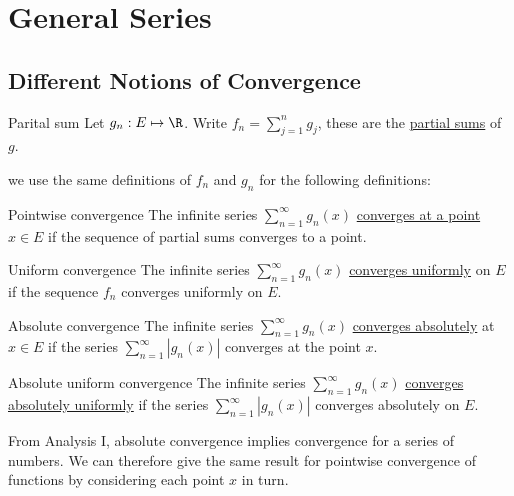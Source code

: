 \documentclass[../Main.tex]{subfiles}
\begin{document}
\section{General Series}
\subsection{Different Notions of Convergence}
\begin{definition}{Parital sum}
    Let $g_n : E \mapsto \R$. Write $f_n = \sum_{j = 1}^n g_j$, these are the \underline{partial sums} of $g$.
\end{definition}
we use the same definitions of $f_n$ and $g_n$ for the following definitions:
\begin{definition}{Pointwise convergence}
    The infinite series $\sum_{n = 1}^\infty g_n(x)$ \underline{converges at a point} $x \in E$ if the sequence of partial sums converges to a point.
\end{definition}
\begin{definition}{Uniform convergence}
    The infinite series $\sum_{n = 1}^\infty g_n(x)$ \underline{converges uniformly} on $E$ if the sequence $f_n$ converges uniformly on $E$.
\end{definition}
\begin{definition}{Absolute convergence}
    The infinite series $\sum_{n = 1}^\infty g_n(x)$ \underline{converges absolutely} at $x \in E$ if the series $\sum_{n = 1}^\infty |g_n(x)|$ converges at the point $x$.
\end{definition}
\begin{definition}{Absolute uniform convergence}
    The infinite series $\sum_{n = 1}^\infty g_n(x)$ \underline{converges absolutely uniformly} if the series $\sum_{n = 1}^\infty |g_n(x)|$ converges absolutely on $E$.
\end{definition}
From Analysis I, absolute convergence implies convergence for a series of numbers. We can therefore give the same result for pointwise convergence of functions by considering each point $x$ in turn.
\end{document}
